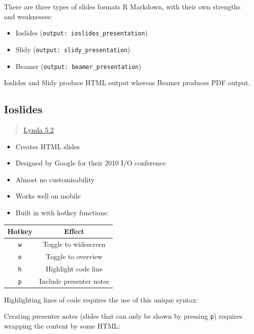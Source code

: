 \documentclass[]{article}
\providecommand{\tightlist}{%
  \setlength{\itemsep}{0pt}\setlength{\parskip}{0pt}}
\begin{document}
There are three types of slides formats R Markdown, with their own
strengths and weaknesses:

\begin{itemize}
\tightlist
\item
  Ioslides (\texttt{output:\ ioslides\_presentation})
\item
  Slidy (\texttt{output:\ slidy\_presentation})
\item
  Beamer (\texttt{output:\ beamer\_presentation})
\end{itemize}

Ioslides and Slidy produce HTML output whereas Beamer produces PDF
output.

\hypertarget{ioslides}{%
\subsection{Ioslides}\label{ioslides}}

\begin{quote}
\href{https://www.lynda.com/RStudio-tutorials/Features-ioslides-presentations/699348/2700140-4.html?srchtrk=index\%3a1\%0alinktypeid\%3a2\%0aq\%3ar+markdown\%0apage\%3a1\%0as\%3arelevance\%0asa\%3atrue\%0aproducttypeid\%3a2}{Lynda
5.2}
\end{quote}

\begin{itemize}
\tightlist
\item
  Creates HTML slides
\item
  Designed by Google for their 2010 I/O conference
\item
  Almost no customisability
\item
  Works well on mobile
\item
  Built in with hotkey functions:
\end{itemize}

\begin{longtable}[]{@{}cc@{}}
\toprule
Hotkey & Effect\tabularnewline
\midrule
\endhead
\texttt{w} & Toggle to widescreen\tabularnewline
\texttt{o} & Toggle to overview\tabularnewline
\texttt{h} & Highlight code line\tabularnewline
\texttt{p} & Include presenter notes\tabularnewline
\bottomrule
\end{longtable}

Highlighting lines of code requires the use of this unique syntax:

Creating presenter notes (slides that can only be shown by pressing
\texttt{p}) requires wrapping the content by some HTML:
\end{document}
